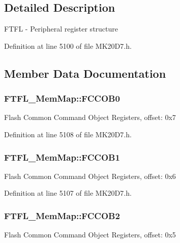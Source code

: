 \subsection{Detailed Description}
F\+T\+FL -\/ Peripheral register structure 

Definition at line 5100 of file M\+K20\+D7.\+h.



\subsection{Member Data Documentation}
\subsubsection[{\texorpdfstring{F\+C\+C\+O\+B0}{FCCOB0}}]{ F\+T\+F\+L\+\_\+\+Mem\+Map\+::\+F\+C\+C\+O\+B0}\hypertarget{struct_f_t_f_l___mem_map_a350907588b2a9e58dd3524a92d01343d}{}\label{struct_f_t_f_l___mem_map_a350907588b2a9e58dd3524a92d01343d}
Flash Common Command Object Registers, offset\+: 0x7 

Definition at line 5108 of file M\+K20\+D7.\+h.

\subsubsection[{\texorpdfstring{F\+C\+C\+O\+B1}{FCCOB1}}]{ F\+T\+F\+L\+\_\+\+Mem\+Map\+::\+F\+C\+C\+O\+B1}\hypertarget{struct_f_t_f_l___mem_map_add93469709934b7ead4586253383596f}{}\label{struct_f_t_f_l___mem_map_add93469709934b7ead4586253383596f}
Flash Common Command Object Registers, offset\+: 0x6 

Definition at line 5107 of file M\+K20\+D7.\+h.

\subsubsection[{\texorpdfstring{F\+C\+C\+O\+B2}{FCCOB2}}]{ F\+T\+F\+L\+\_\+\+Mem\+Map\+::\+F\+C\+C\+O\+B2}\hypertarget{struct_f_t_f_l___mem_map_a556e1f48326b290f11167fcf7f1e470c}{}\label{struct_f_t_f_l___mem_map_a556e1f48326b290f11167fcf7f1e470c}
Flash Common Command Object Registers, offset\+: 0x5 

